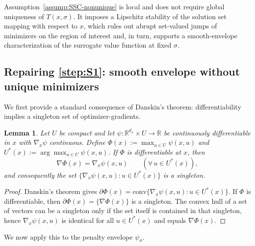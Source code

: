 \documentclass{article}
\newtheorem{lemma}[theorem]{Lemma}
\newtheorem{assumption}[theorem]{Assumption}
\newcommand{\1}{\mathbf{1}}
\begin{document}


Assumption~\ref{assump:SSC-nonunique} is local and does not require global uniqueness of $T(x,\sigma)$.
It imposes a Lipschitz stability of the solution set mapping with respect to $x$, which rules out abrupt set-valued
jumps of minimizers on the region of interest and, in turn, supports a smooth-envelope characterization of the surrogate
value function at fixed $\sigma$.


\subsection{Repairing \ref{step:S1}: smooth envelope without unique minimizers}\label{app:nonunique-S1}
We first provide a standard consequence of Danskin's theorem: differentiability implies a singleton set of optimizer-gradients.

\begin{lemma}\label{lem:danskin-singleton}
Let $U$ be compact and let $\psi:\mathbb{R}^{d_x}\times U\to\mathbb{R}$ be continuously differentiable in $x$ with $\nabla_x\psi$ continuous.
Define $\Phi(x):=\max_{u\in U}\psi(x,u)$ and $U^*(x):=\arg\max_{u\in U}\psi(x,u)$.
If $\Phi$ is differentiable at $x$, then
\[
\nabla \Phi(x)=\nabla_x\psi(x,u)\qquad(\forall\,u\in U^*(x)),
\]
and consequently the set $\{\nabla_x\psi(x,u):u\in U^*(x)\}$ is a singleton.
\end{lemma}

\begin{proof}
Danskin's theorem gives $\partial \Phi(x)=\mathrm{conv}\{\nabla_x\psi(x,u):u\in U^*(x)\}$.
If $\Phi$ is differentiable, then $\partial \Phi(x)=\{\nabla\Phi(x)\}$ is a singleton.
The convex hull of a set of vectors can be a singleton only if the set itself is contained in that singleton,
hence $\nabla_x\psi(x,u)$ is identical for all $u\in U^*(x)$ and equals $\nabla\Phi(x)$.
\end{proof}
We now apply this to the penalty envelope $\psi_\sigma$. 
\end{document}
